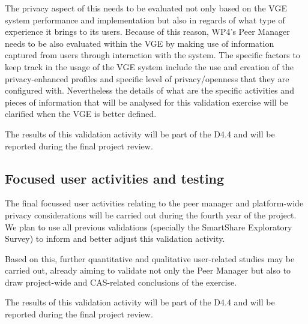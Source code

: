 The privacy aspect of this needs to be evaluated not only based on the VGE system performance and implementation but also in regards of what type of experience it brings to its users. Because of this reason, WP4's Peer Manager needs to be also evaluated within the VGE by making use of information captured from users through interaction with the system. The specific factors to keep track in the usage of the VGE system include the use and creation of the privacy-enhanced profiles and specific level of privacy/openness that they are configured with.  Nevertheless the details of what are the specific activities and pieces of information that will be analysed for this validation exercise will be clarified when the VGE is better defined. 

The results of this validation activity will be part of the D4.4 and will be reported during the final project review. 

\subsection{Focused user activities and testing}
The final focussed user activities relating to the peer manager and platform-wide privacy considerations will be carried out during the fourth year of the project. We plan to use all previous validations (specially the SmartShare Exploratory Survey) to inform and better adjust this validation activity. 

Based on this, further quantitative and qualitative user-related studies may be carried out, already aiming to validate not only the Peer Manager but also to draw project-wide and CAS-related conclusions of the exercise. 

The results of this validation activity will be part of the D4.4 and will be reported during the final project review. 
